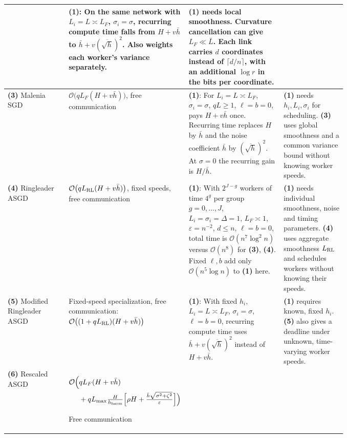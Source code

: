 \begin{table}[tp]
\begin{threeparttable}
\begin{tabularx}{\linewidth}{@{}>{\raggedright\arraybackslash}p{0.18\linewidth}>{\raggedright\arraybackslash}p{0.30\linewidth}>{\raggedright\arraybackslash}p{0.29\linewidth}>{\raggedright\arraybackslash}X@{}}
& \textbf{(1)}: On the same network with $L_i=L\asymp L_F$, $\sigma_i=\sigma$, recurring compute time falls from $H+v\bar h$ to $\bar h+v(\overline{\sqrt h})^2$. Also weights each worker's variance separately.
& \textbf{(1)} needs local smoothness. Curvature cancellation can give $L_F\ll\bar L$. Each link carries $d$ coordinates instead of $\lceil d/n\rceil$, with an additional $\log r$ in the bits per coordinate. \\
\midrule
\textbf{(3)} Malenia SGD \citep[Thm.~A.4]{dcsnMalenia}
& $\mathcal{O}\big(qL_F(H+v\bar h)\big)$, free communication
& \textbf{(1)}: For $L_i=L\asymp L_F$, $\sigma_i=\sigma$, $qL\ge1$, $\ell=b=0$, pays $H+v\bar h$ once. Recurring time replaces $H$ by $\bar h$ and the noise coefficient $\bar h$ by $(\overline{\sqrt h})^2$. At $\sigma=0$ the recurring gain is $H/\bar h$.
& \textbf{(1)} needs $h_i,L_i,\sigma_i$ for scheduling. \textbf{(3)} uses global smoothness and a common variance bound without knowing worker speeds. \\
\midrule
\textbf{(4)} Ringleader ASGD \citep[\S5.2]{dcsnRingleader}
& $\mathcal{O}\big(qL_{\rm RL}(H+v\bar h)\big)$, fixed speeds, free communication
& \textbf{(1)}: With $2^{J-g}$ workers of time $4^g$ per group $g=0,\ldots,J$, $L_i=\sigma_i=\Delta=1$, $L_F\asymp1$, $\varepsilon=n^{-2}$, $d\le n$, $\ell=b=0$, total time is $\mathcal{O}(n^7\log^2 n)$ versus $\mathcal{O}(n^8)$ for \textbf{(3)}, \textbf{(4)}. Fixed $\ell,b$ add only $\mathcal{O}(n^5\log n)$ to \textbf{(1)} here.
& \textbf{(1)} needs individual smoothness, noise and timing parameters. \textbf{(4)} uses aggregate smoothness $L_{\rm RL}$ and schedules workers without knowing their speeds. \\
\midrule
\textbf{(5)} Modified Ringleader ASGD \citep[App.~C.3]{dcsnRingleader}
& Fixed-speed specialization, free communication: $\mathcal{O}\big((1+qL_{\rm RL})(H+v\bar h)\big)$
& \textbf{(1)}: With fixed $h_i$, $L_i=L\asymp L_F$, $\sigma_i=\sigma$, $\ell=b=0$, recurring compute time uses $\bar h+v(\overline{\sqrt h})^2$ instead of $H+v\bar h$.
& \textbf{(1)} requires known, fixed $h_i$. \textbf{(5)} also gives a deadline under unknown, time-varying worker speeds. \\
\midrule
\textbf{(6)} Rescaled ASGD \citep[Cor.~4.2]{dcsnRescaled}
& $\begin{aligned}[t]
\mathcal{O}\Big(&qL_F(H+v\bar h)\\
 &+q L_{\max}\tfrac{H}{h_{\rm harm}}
 \Big[\rho H+\tfrac{\bar h\sqrt{\sigma^2+\zeta^2}}{\varepsilon}\Big]\Big)
\end{aligned}$\par Free communication

\end{tabularx}
\end{threeparttable}
\end{table}
